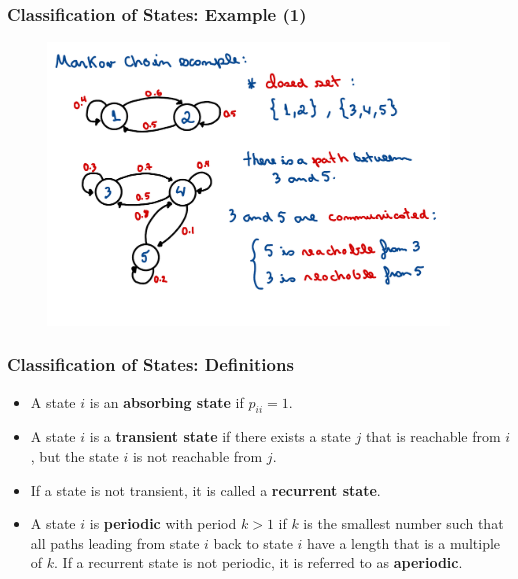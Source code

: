 \begin{frame}
    \frametitle{Classification of States: Example (1)}
        \begin{figure}
            \centering
            \includegraphics[width=0.95\textwidth]{slides/figures/classification_states_example_one.pdf}
        \end{figure}
\end{frame}

\begin{frame}
    \frametitle{Classification of States: Definitions}
    \begin{itemize}

        \item A state $i$ is an \textbf{absorbing state} if $p_{ii} = 1$.

        \item A state $i$ is a \textbf{transient state} if there exists a state $j$
        that is reachable from $i$, but the state $i$ is not reachable from $j$.


        \item If a state is not transient, it is called a \textbf{recurrent state}.

        \item A state $i$ is \textbf{periodic} with period $k>1$ if $k$ is 
        the smallest number such that all paths leading from state $i$ back 
        to state $i$ have a length that is a multiple of $k$. If a recurrent state
        is not periodic, it is referred to as \textbf{aperiodic}.
    \end{itemize}
\end{frame}

